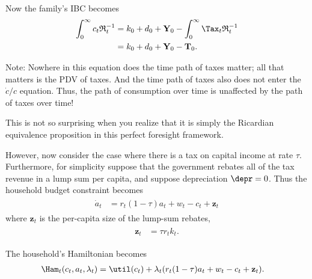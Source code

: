 \documentclass{handout}\usepackage{handoutSetup}\usepackage{handoutShortcuts}
\begin{document}
Now the family's IBC becomes
\begin{equation}\begin{gathered}\begin{aligned}
        \int_{0}^{\infty} c_{t} \mathfrak{R}^{-1}_{t} & =  k_{0}+{d}_{0}+\mathbf{Y}_{0}-\int_{0}^{\infty} \Tax  _{t} \mathfrak{R}^{-1}_{t}
\\      & =  k_{0}+{d}_{0}+\mathbf{Y}_{0}-\mathbf{T}_{0} \label{eq:famibc}.
\end{aligned}\end{gathered}\end{equation}

Note: Nowhere in this equation does the time path of taxes matter;
all that matters is the PDV of taxes.  And the time path of taxes
also does not enter the $\dot{c}/c$ equation.  Thus, the path 
of consumption over time is unaffected by the path of taxes over time!

This is not so surprising when you realize that it is simply the 
Ricardian equivalence proposition in this perfect foresight framework.

However, now consider the case where there is a tax on capital income
at rate $\tau$.  Furthermore, for simplicity suppose that the
government rebates all of the tax revenue in a lump sum per capita,
and suppose depreciation $\depr=0$.  Thus the household budget
constraint becomes
\begin{equation}\begin{gathered}\begin{aligned}
        \dot{a}_t & =  r_{t}(1-\tau)a_{t}+w_{t}-c_{t}+\mathbf{z}_{t}
\end{aligned}\end{gathered}\end{equation}
where $\mathbf{z}_{t}$ is the per-capita size of the lump-sum rebates,
\begin{equation}\begin{gathered}\begin{aligned}
        \mathbf{z}_{t} & =  \tau r_{t} k_{t}.
\end{aligned}\end{gathered}\end{equation}

The household's Hamiltonian becomes
\begin{equation}\begin{gathered}\begin{aligned}
        \Ham_{t}(c_{t},a_{t},\lambda_{t}) & =  \util(c_{t})+\lambda_{t}(r_{t}(1-\tau)a_{t}+w_{t}-c_{t}+\mathbf{z}_{t}).
\end{aligned}\end{gathered}\end{equation}
\end{document}
